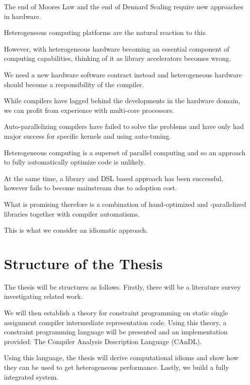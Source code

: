     The end of Moores Law and the end of Dennard Scaling require new approaches
    in hardware.

    Heterogeneous computing platforms are the natural reaction to this.

    However, with heterogeneous hardware becoming an essential component of
    computing capabilities, thinking of it as library accelerators becomes
    wrong.

    We need a new hardware software contract instead and heterogeneous hardware
    should become a responsibility of the compiler.

    While compilers have lagged behind the developments in the hardware domain,
    we can profit from experience with multi-core processors.

    Auto-parallelizing compilers have failed to solve the problems and have only
    had major success for specific kernels and using auto-tuning.

    Heterogeneous computing is a superset of parallel computing and so an
    approach to fully automatically optimize code is unlikely.

    At the same time, a library and DSL based approach has been successful,
    however fails to become mainstream due to adoption cost.

    What is promising therefore is a combination of hand-optimized and
    -parallelized libraries together with compiler automatisms.

    This is what we consider an idiomatic approach.

\section{Structure of the Thesis}

    The thesis will be structures as follows.
    Firstly, there will be a literature survey investigating related work.

    We will then establish a theory for constraint programming on static single
    assignment compiler intermediate representation code.
    Using this theory, a constraint programming language will be presented and
    an implementation provided: The Compiler Analysis Description Language
    (CAnDL).

    Using this language, the thesis will derive computational idioms and show
    how they can be used to get heterogeneous performance.
    Lastly, we build a fully integrated system.